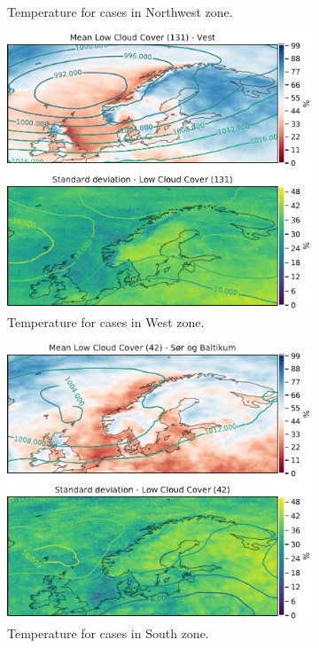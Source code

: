 \begin{figure}
\begin{subfigure}[b]{0.49\textwidth}
    \caption{Temperature for cases in Northwest zone.}
    \label{fig:NordWestCC}
\end{subfigure}
\begin{subfigure}[b]{0.49\textwidth}
    \centering
    \includegraphics[width=\textwidth]{Figures/CCVest.pdf}
    \caption{Temperature for cases in West zone.}
    \label{fig:WestCC}
\end{subfigure}
\begin{subfigure}[b]{0.49\textwidth}
    \centering
    \includegraphics[width=\textwidth]{Figures/CCSor.pdf}
    \caption{Temperature for cases in South zone.}
    \label{fig:SouthCC}
\end{subfigure}
\caption{}
\label{fig:cloudcoverzones}
\end{figure}

